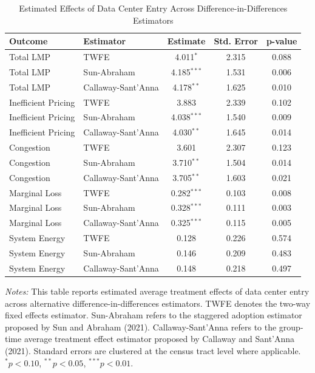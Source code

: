 \begin{table}[htbp]
\centering
\caption{Estimated Effects of Data Center Entry Across Difference-in-Differences Estimators}
\label{tab:did_estimators}
\begin{tabular}{llccc}
\hline\hline
\textbf{Outcome} & \textbf{Estimator} & \textbf{Estimate} & \textbf{Std. Error} & \textbf{p-value} \\
\hline
Total LMP & TWFE & 4.011$^{*}$ & 2.315 & 0.088 \\
Total LMP & Sun-Abraham & 4.185$^{***}$ & 1.531 & 0.006 \\
Total LMP & Callaway-Sant'Anna & 4.178$^{**}$ & 1.625 & 0.010 \\
Inefficient Pricing & TWFE & 3.883 & 2.339 & 0.102 \\
Inefficient Pricing & Sun-Abraham & 4.038$^{***}$ & 1.540 & 0.009 \\
Inefficient Pricing & Callaway-Sant'Anna & 4.030$^{**}$ & 1.645 & 0.014 \\
Congestion & TWFE & 3.601 & 2.307 & 0.123 \\
Congestion & Sun-Abraham & 3.710$^{**}$ & 1.504 & 0.014 \\
Congestion & Callaway-Sant'Anna & 3.705$^{**}$ & 1.603 & 0.021 \\
Marginal Loss & TWFE & 0.282$^{***}$ & 0.103 & 0.008 \\
Marginal Loss & Sun-Abraham & 0.328$^{***}$ & 0.111 & 0.003 \\
Marginal Loss & Callaway-Sant'Anna & 0.325$^{***}$ & 0.115 & 0.005 \\
System Energy & TWFE & 0.128 & 0.226 & 0.574 \\
System Energy & Sun-Abraham & 0.146 & 0.209 & 0.483 \\
System Energy & Callaway-Sant'Anna & 0.148 & 0.218 & 0.497 \\
\hline
\hline
\end{tabular}
\vspace{0.5em}
\begin{minipage}{\textwidth}
\footnotesize
\textit{Notes:} This table reports estimated average treatment effects of data center entry across alternative difference-in-differences estimators. TWFE denotes the two-way fixed effects estimator. Sun-Abraham refers to the staggered adoption estimator proposed by Sun and Abraham (2021). Callaway-Sant'Anna refers to the group-time average treatment effect estimator proposed by Callaway and Sant'Anna (2021). Standard errors are clustered at the census tract level where applicable. $^{*}p<0.10$, $^{**}p<0.05$, $^{***}p<0.01$.
\end{minipage}
\end{table}

